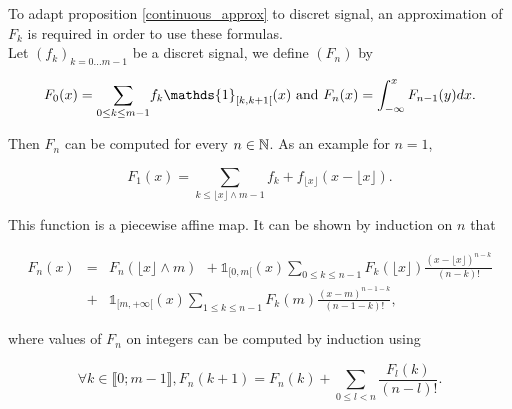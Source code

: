 
To adapt proposition \ref{continuous_approx} to discret signal, an approximation of $F_{k}$ is required in order to use these formulas.\\
\medbreak
Let $(f_k)_{k=0...m-1}$ be a discret signal, we define $(F_n)$ by

\begin{equation}
F_{0} (x) =\underset{0\le k \le m-1}{\sum}f_{k} \mathds{1}_{[k,k+1[}(x) \txt{ and }  F_{n}(x)=\int_{-\infty}^{x}F_{n-1}(y)dx.
\label{defintion_fn}
\end{equation}

\noindent Then $F_{n}$ can be computed for every $n\in\mathbb{N}$. As an example for $n=1$,

\begin{equation*}
F_{1}(x)=\underset{k\le \lfloor x\rfloor \wedge m-1}{\sum}f_{k}+ f_{\lfloor x\rfloor}
(x-\lfloor x\rfloor).
\end{equation*}

\noindent This function is a piecewise affine map. It can be shown by induction on $n$ that

\begin{eqnarray*}
F_{n}(x) &=& F_{n}(\lfloor x\rfloor \wedge m)~~+\mathds{1}_{[0,m[}(x) \underset{0\le k \le n-1}{\sum}F_{k}(\lfloor x \rfloor) \frac{(x-\lfloor x \rfloor)^{n-k}}{(n-k)!}\\
          &+&\mathds{1}_{[m,+\infty[}(x)\underset{1\le k \le n-1}{\sum}F_{k}(m) \frac{(x-m)^{n-1-k}}{(n-1-k)!},
\end{eqnarray*}

\noindent where values of $F_n$ on integers can be computed by induction using

\begin{equation*}
\forall k \in \llbracket 0 ; m-1 \rrbracket, F_{n}(k+1)=F_{n}(k)+\underset{0\le l < n}{\sum} \frac{F_{l}(k)}{(n-l)!}.
\end{equation*}




